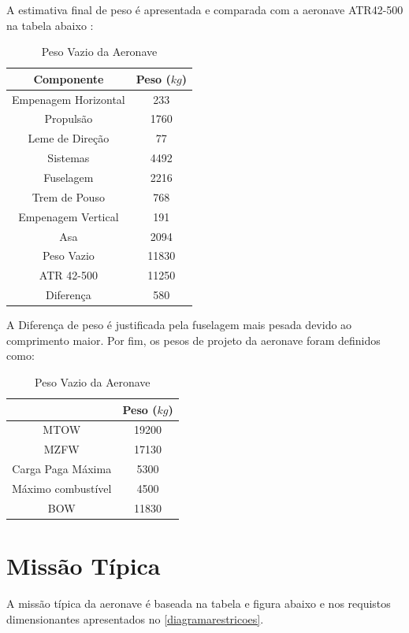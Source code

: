 A estimativa final de peso é apresentada e comparada com a aeronave ATR42-500 na tabela abaixo :

\begin{table}[H]
    \centering
    \begin{tabular}{cc}
    \toprule
    Componente & Peso ($kg$) \\ \midrule
    Empenagem Horizontal & 233 \\
    Propulsão & 1760 \\
    Leme de Direção & 77 \\
    Sistemas & 4492 \\
    Fuselagem & 2216 \\
    Trem de Pouso & 768 \\
    Empenagem Vertical & 191 \\
    Asa & 2094 \\ \midrule
    Peso Vazio & 11830 \\
    ATR 42-500 & 11250 \\ \midrule
    Diferença  & 580 \\
    \bottomrule
    \end{tabular}
    \caption{Peso Vazio da Aeronave}
    \label{tab:results_weight}
\end{table}

A Diferença de peso é justificada pela fuselagem mais pesada devido ao comprimento maior. Por fim, os pesos de projeto da aeronave foram definidos como:

\begin{table}[H]
    \centering
    \begin{tabular}{cc}
    \toprule
       & Peso ($kg$) \\ \midrule
    MTOW & 19200 \\
    MZFW & 17130 \\
    Carga Paga Máxima & 5300 \\
    Máximo combustível & 4500 \\
    BOW & 11830 \\
    \bottomrule
    \end{tabular}
    \caption{Peso Vazio da Aeronave}
    \label{tab:weight}
\end{table}


\section{Missão Típica}

A missão típica da aeronave é baseada na tabela e figura abaixo e nos requistos dimensionantes apresentados no \autoref{diagramarestricoes}.

